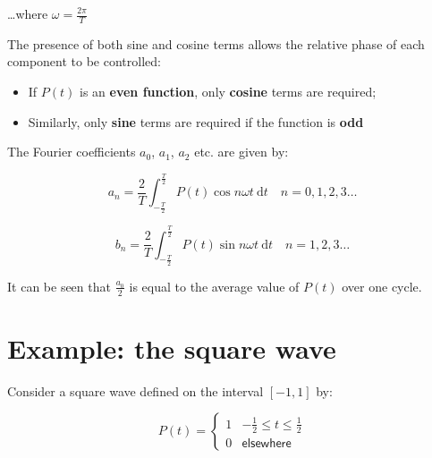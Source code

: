 \documentclass[
]{book}
\providecommand{\tightlist}{%
  \setlength{\itemsep}{0pt}\setlength{\parskip}{0pt}}
\begin{document}
\ldots where \(\omega = \frac{2\pi}{T}\)

The presence of both sine and cosine terms allows the relative phase of each component to be controlled:

\begin{itemize}
\tightlist
\item
  If \(P(t)\) is an \textbf{even function}, only \textbf{cosine} terms are required;
\item
  Similarly, only \textbf{sine} terms are required if the function is \textbf{odd}
\end{itemize}

The Fourier coefficients \(a_0\), \(a_1\), \(a_2\) etc. are given by:

\begin{equation}
a_n = \frac{2}{T} \int_{-\frac{T}{2}}^{\frac{T}{2}} P(t) \cos n \omega t ~\mathrm{d}t \quad n = 0,1,2,3 \dots
\end{equation}

\begin{equation}
b_n = \frac{2}{T} \int_{-\frac{T}{2}}^{\frac{T}{2}} P(t) \sin n \omega t ~\mathrm{d}t \quad n = 1,2,3 \dots
\end{equation}

It can be seen that \(\frac{a_0}{2}\) is equal to the average value of \(P(t)\) over one cycle.

\hypertarget{sec:ch11-squarewave}{%
\section{Example: the square wave}\label{sec:ch11-squarewave}}

Consider a square wave defined on the interval \(\left[-1,1 \right]\) by:

\begin{equation}
P(t) = \left\{ \begin{array}{rl} 1 & -\frac{1}{2} \leq t \leq \frac{1}{2} \\ 0 & \textsf{elsewhere} \end{array} \right.
\end{equation}
\end{document}
